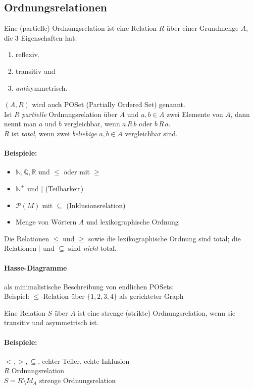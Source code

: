 \subsection{Ordnungsrelationen}
\begin{defi}[Ordnungsrelation]
Eine (partielle) Ordnungsrelation ist eine Relation $R$ über einer Grundmenge $A$, die $3$ Eigenschaften hat:
\begin{enumerate}
\item reflexiv,
\item transitiv und
\item \emph{anti}symmetrisch.
\end{enumerate}
$(A,R)$ wird auch POSet (Partially Ordered Set) genannt.\\
Ist $R$ \emph{partielle} Ordnungsrelation über $A$ und $a,b \in A$ zwei Elemente von $A$, dann nennt man $a$ und $b$ vergleichbar, wenn $a\, R\, b$ oder $b\, R\, a$.\\
$R$ ist \emph{total}, wenn zwei \emph{beliebige} $a,b\in A$ vergleichbar sind.
\end{defi}

\paragraph{Beispiele:}
\begin{itemize}
\item $\mathbb{N,Q,R}$ und $\leq$ oder mit $\geq$
\item $\mathbb{N}^+$ und $|$ (Teilbarkeit)
\item $\mathcal{P}(M)$ mit $\subseteq$ (Inklusionsrelation)
\item Menge von Wörtern $A$ und lexikographische Ordnung
\end{itemize}
Die Relationen $\leq$ und $\geq$ sowie die lexikographische Ordnung sind total; die Relationen $|$ und $\subseteq$ sind \emph{nicht} total.

\paragraph{Hasse-Diagramme}als minimalistische Beschreibung von endlichen POSets:\\
Beispiel: $\leq$-Relation über $\{1,2,3,4\}$ als gerichteter Graph

\begin{defi}
Eine Relation $S$ über $A$ ist eine strenge (strikte) Ordnungsrelation, wenn sie transitiv und asymmetrisch ist.
\end{defi}
%
\paragraph{Beispiele:}$<,>,\subseteq$, \glqq echter Teiler\grqq , \glqq echte Inklusion\grqq
\ \\
$R$ Ordnungsrelation\\
$S=R\setminus Id_A$ strenge Ordnungsrelation

%